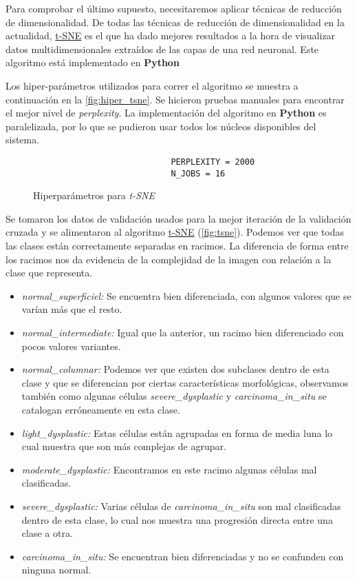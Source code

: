 Para comprobar el último supuesto, necesitaremos aplicar técnicas de reducción
de dimensionalidad. De todas las técnicas de reducción de dimensionalidad en la
actualidad, \hyperlink{abbr}{t-SNE} es el
que ha dado mejores resultados a la hora de visualizar datos multidimensionales
extraídos de las capas de una red neuronal. Este algoritmo está implementado en
\textbf{Python}

Los hiper-parámetros utilizados para correr el algoritmo se muestra a
continuación en la \autoref{fig:hiper_tsne}. Se hicieron pruebas manuales para
encontrar el mejor nivel de \emph{perplexity}. La implementación del algoritmo
en \textbf{Python} es paralelizada, por lo que se pudieron usar todos los
núcleos disponibles del sistema. 

\begin{figure}[H]
    \centering
\begin{verbatim}
                            PERPLEXITY = 2000
                            N_JOBS = 16
\end{verbatim}
\caption{Hiperparámetros para \emph{t-SNE}}\label{fig:hiper_tsne}
\end{figure}

Se tomaron los datos de validación usados para la mejor iteración de la
validación cruzada y se alimentaron al algoritmo \hyperlink{abbr}{t-SNE}
(\autoref{fig:tsne}). Podemos ver que todas las clases están correctamente
separadas en racimos. La diferencia de forma entre los racimos nos da evidencia
de la complejidad de la imagen con relación a la clase que representa.

\begin{itemize}
  \item{\emph{normal\_superficiel:}} Se encuentra bien diferenciada, con algunos valores que se varían
  más que el resto.
  \item{\emph{normal\_intermediate:}} Igual que la anterior, un racimo bien diferenciado con pocos valores
  variantes.
  \item{\emph{normal\_columnar:}} Podemos ver que existen dos subclases dentro de esta clase y que
  se diferencian por ciertas características morfológicas, observamos también como algunas células
  \emph{severe\_dysplastic} y \emph{carcinoma\_in\_situ} se catalogan erróneamente en esta clase.
  \item{\emph{light\_dysplastic:}} Estas células están agrupadas en forma de media luna lo cual
  muestra que son más complejas de agrupar.
  \item{\emph{moderate\_dysplastic:}} Encontramos en este racimo algunas células mal clasificadas.
  \item{\emph{severe\_dysplastic:}} Varias células de \emph{carcinoma\_in\_situ} son mal
  clasificadas dentro de esta clase, lo cual nos muestra una progresión directa entre una
  clase a otra.
  \item{\emph{carcinoma\_in\_situ:}} Se encuentran bien diferenciadas y no se confunden con
  ninguna normal.
\end{itemize}

